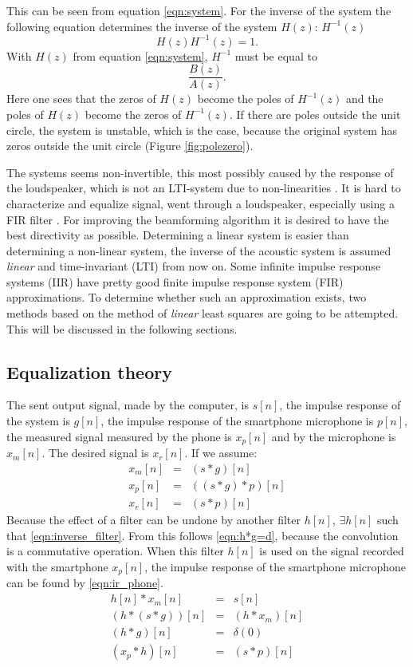 This can be seen from equation \eqref{eqn:system}.
For the inverse of the system the following equation determines the inverse of the system $H(z)$: $H^{-1}(z)$
\begin{equation*}
H(z)H^{-1}(z)=1.
\end{equation*}
With $H(z)$ from equation \eqref{eqn:system}, $H^{-1}$ must be equal to
\begin{equation*}
\dfrac{B(z)}{A(z)}.
\end{equation*}
Here one sees that the zeros of $H(z)$ become the poles of $H^{-1}(z)$ and the poles of $H(z)$ become the zeros of $H^{-1}(z)$.
If there are poles outside the unit circle, the system is unstable, which is the case, because the original system has zeros outside the unit circle (Figure \ref{fig:polezero}).

The systems seems non-invertible, this most possibly caused by the response of the loudspeaker, which is not an LTI-system due to non-linearities \cite{Thomas2006}.
It is hard to characterize and equalize signal, went through a loudspeaker, especially using a FIR filter \cite{karjalainen2007equalization}.
For improving the beamforming algorithm it is desired to have the best directivity as possible.
Determining a linear system is easier than determining a non-linear system, the inverse of the acoustic system is assumed \textit{linear} and time-invariant (LTI) from now on.
Some infinite impulse response systems (IIR) have pretty good finite impulse response system (FIR) approximations.
To determine whether such an approximation exists, two methods based on the method of \textit{linear} least squares are going to be attempted.
This will be discussed in the following sections.

\subsection{Equalization theory}
\label{ssec:eq-theory}
The sent output signal, made by the computer, is $s[n]$, the impulse response of the system is $g[n]$, the impulse response of the smartphone microphone is $p[n]$, the measured signal measured by the phone is $x_p[n]$ and by the microphone is $x_m[n]$.
The desired signal is $x_r[n]$.
If we assume:
\begin{eqnarray}
x_m[n]&=&(s*g)[n]\\
x_p[n]&=&((s*g)*p)[n]\\
x_r[n]&=&(s*p)[n]
\end{eqnarray}
Because the effect of a filter can be undone by another filter $h[n]$, $\exists h[n]$ such that \eqref{eqn:inverse_filter}. From this follows \eqref{eqn:h*g=d}, because the convolution is a commutative operation. When this filter $h[n]$ is used on the signal recorded with the smartphone $x_p[n]$, the impulse response of the smartphone microphone can be found by \eqref{eqn:ir_phone}.
\begin{eqnarray}
\label{eqn:inverse_filter}h[n]*x_m[n]&=&s[n]\\
(h*(s*g))[n]&=&(h*x_m)[n]\\
\label{eqn:h*g=d}(h*g)[n]&=&\delta(0)\\
\label{eqn:ir_phone}(x_p*h)[n]&=&(s*p)[n]
\end{eqnarray}

